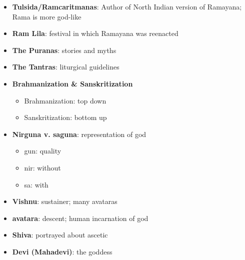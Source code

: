 \documentclass[11pt]{article} %
\begin{document}
\begin{itemize}
\item
{\bf Tulsida/Ramcaritmanas}: Author of North Indian version of Ramayana; Rama is more god-like

\item
{\bf Ram Lila}: festival in which Ramayana was reenacted

\item
{\bf The Puranas}: stories and myths

\item
{\bf The Tantras}: liturgical guidelines

\item
{\bf Brahmanization \& Sanskritization}
\begin{itemize}
\item Brahmanization: top down
\item Sanskritization: bottom up
\end{itemize}

\item
{\bf Nirguna v. saguna}: representation of god
\begin{itemize}
\item gun: quality
\item nir: without
\item sa: with
\end{itemize}

\item
{\bf Vishnu}: sustainer; many avataras

\item
{\bf avatara}: descent; human incarnation of god

\item
{\bf Shiva}: portrayed about ascetic

\item
{\bf Devi (Mahadevi)}: the goddess

\end{itemize}
\end{document}
